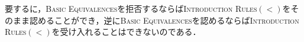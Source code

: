 \documentclass[twoside,14Q,dvipdfmx]{jsarticle}
\theoremstyle{definition}
\begin{document}
要するに，\textsc{Basic Equivalences}を拒否するならば\textsc{Introduction Rules$(<)$}をそのまま認めることができ，逆に\textsc{Basic Equivalences}を認めるならば\textsc{Introduction Rules$(<)$}を受け入れることはできないのである．

\end{document}
